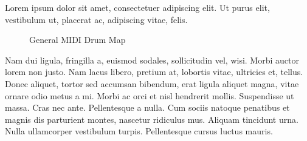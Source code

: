 \documentclass{article}
\begin{document}
Lorem ipsum dolor sit amet, consectetuer adipiscing elit. Ut purus elit, vestibulum ut, placerat ac, adipiscing vitae, felis.

\begin{figure}[h]
    \centering
    
    \caption{General MIDI Drum Map}
    \label{fig:general_midi_drum_map}
\end{figure}

Nam dui ligula, fringilla a, euismod sodales, sollicitudin vel, wisi. Morbi auctor lorem non justo. Nam lacus libero, pretium at, lobortis vitae, ultricies et, tellus. Donec aliquet, tortor sed accumsan bibendum, erat ligula aliquet magna, vitae ornare odio metus a mi. Morbi ac orci et nisl hendrerit mollis. Suspendisse ut massa. Cras nec ante. Pellentesque a nulla. Cum sociis natoque penatibus et magnis dis parturient montes, nascetur ridiculus mus. Aliquam tincidunt urna. Nulla ullamcorper vestibulum turpis. Pellentesque cursus luctus mauris.
\end{document}
